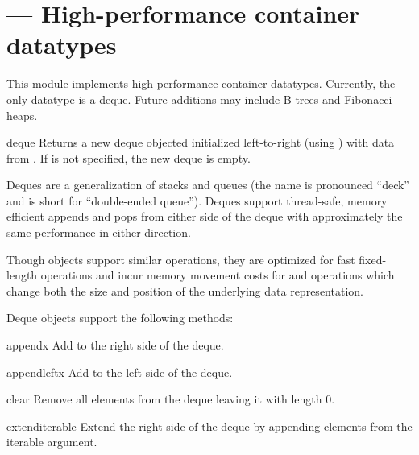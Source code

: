 \section{ ---
         High-performance container datatypes}



This module implements high-performance container datatypes.  Currently, the
only datatype is a deque.  Future additions may include B-trees
and Fibonacci heaps.

\begin{funcdesc}{deque}{}
  Returns a new deque objected initialized left-to-right (using
  ) with data from .  If 
  is not specified, the new deque is empty.

  Deques are a generalization of stacks and queues (the name is pronounced
  ``deck'' and is short for ``double-ended queue'').  Deques support
  thread-safe, memory efficient appends and pops from either side of the deque
  with approximately the same  performance in either direction.

  Though  objects support similar operations, they are optimized
  for fast fixed-length operations and incur  memory movement costs
  for  and  operations which change both the
  size and position of the underlying data representation.
\end{funcdesc}

Deque objects support the following methods:

\begin{methoddesc}{append}{x}
   Add  to the right side of the deque.
\end{methoddesc}

\begin{methoddesc}{appendleft}{x}
   Add  to the left side of the deque.
\end{methoddesc}

\begin{methoddesc}{clear}{}
   Remove all elements from the deque leaving it with length 0.
\end{methoddesc}

\begin{methoddesc}{extend}{iterable}
   Extend the right side of the deque by appending elements from
   the iterable argument.
\end{methoddesc}

